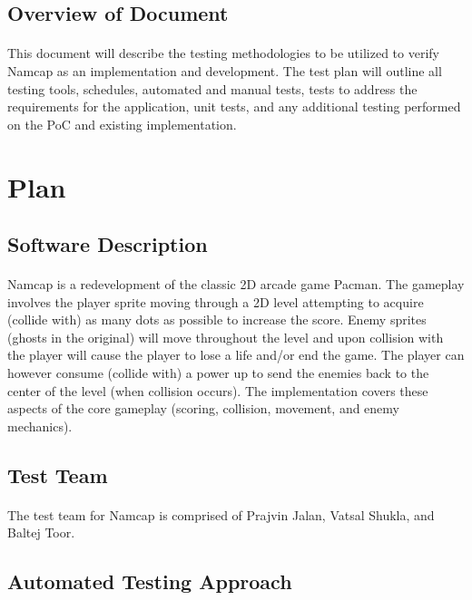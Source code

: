 \documentclass[12pt, titlepage]{article}
\begin{document}
\subsection{Overview of Document}
\paragraph{}
This document will describe the testing methodologies to be utilized to verify Namcap as an implementation and development. The test plan will outline all testing tools, schedules, automated and manual tests, tests to address the requirements for the application, unit tests, and any additional testing performed on the PoC and existing implementation.

\section{Plan}
	
\subsection{Software Description}
\paragraph{}
Namcap is a redevelopment of the classic 2D arcade game Pacman. The gameplay involves the player sprite moving through a 2D level attempting to acquire (collide with) as many dots as possible to increase the score. Enemy sprites (ghosts in the original) will move throughout the level and upon collision with the player will cause the player to lose a life and/or end the game. The player can however consume (collide with) a power up to send the enemies back to the center of the level (when collision occurs). The implementation covers these aspects of the core gameplay (scoring, collision, movement, and enemy mechanics).

\subsection{Test Team}
\paragraph{}
The test team for Namcap is comprised of Prajvin Jalan, Vatsal Shukla, and Baltej Toor.

\subsection{Automated Testing Approach}
\end{document}
